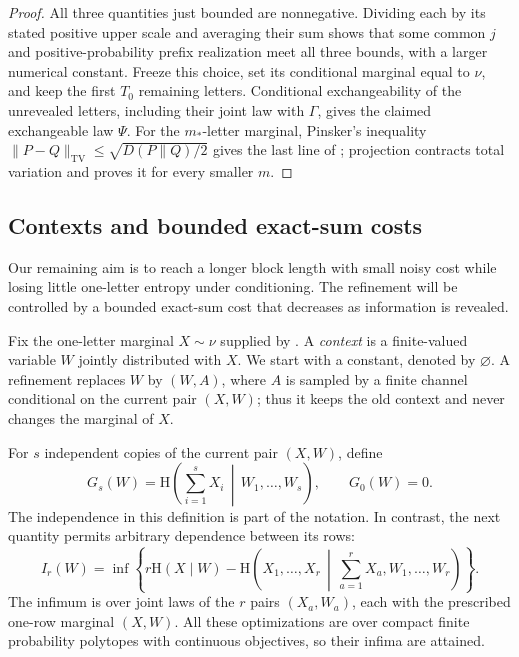 \begin{proof}
All three quantities just bounded are nonnegative.  Dividing each by its
stated positive upper scale and averaging their sum shows that some
common $j$ and positive-probability prefix realization meet all three
bounds, with a larger numerical constant.  Freeze this choice, set its
conditional marginal equal to $\nu$, and keep the first $T_0$ remaining
letters.  Conditional exchangeability of the unrevealed letters,
including their joint law with $\Gamma$, gives the claimed exchangeable
law $\Psi$.  For the $m_*$-letter marginal, Pinsker's inequality
$\|P-Q\|_{\mathrm{TV}}\le\sqrt{D(P\|Q)/2}$ gives the last line of
; projection contracts total variation and proves it
for every smaller $m$.
\end{proof}

\subsection{Contexts and bounded exact-sum costs}

Our remaining aim is to reach a longer block length with small noisy cost
while losing little one-letter entropy under conditioning. The refinement
will be controlled by a bounded exact-sum cost that decreases as information
is revealed.

Fix the one-letter marginal $X\sim\nu$ supplied by
. A \emph{context} is a finite-valued
variable $W$ jointly distributed with $X$.  We start with a constant,
denoted by $\varnothing$.  A refinement replaces $W$ by $(W,A)$, where
$A$ is sampled by a finite channel conditional on the current pair
$(X,W)$; thus it keeps the old context and never changes the marginal of
$X$.

For $s$ independent copies of the current pair $(X,W)$, define
\begin{equation}
\label{entropy-foundations:G-definition}
 G_s(W)=\mathrm H\!\left(\sum_{i=1}^{s}X_i\,\middle|\,W_1,\ldots,W_s\right),
 \qquad G_0(W)=0.
\end{equation}
The independence in this definition is part of the notation.  In contrast,
the next quantity permits arbitrary dependence between its rows:
\begin{equation}
\label{entropy-foundations:I-definition}
 I_r(W)=\inf\left\{
 r\mathrm H(X\mid W)
 -\mathrm H\!\left(X_1,\ldots,X_r\,\middle|\,
                  \sum_{a=1}^{r}X_a,W_1,\ldots,W_r\right)
                 \right\}.
\end{equation}
The infimum is over joint laws of the $r$ pairs $(X_a,W_a)$, each with
the prescribed one-row marginal $(X,W)$.  All these optimizations are over
compact finite probability polytopes with continuous objectives, so their
infima are attained.

